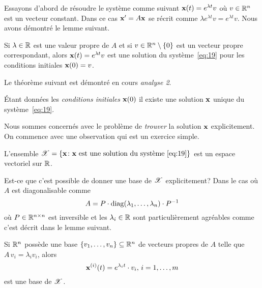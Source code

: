 Essayons d'abord de résoudre le système comme suivant $\mathbf{x}(t) = e^{\lambda t} v$ où $v \in \mathbb{R}^n$ est un vecteur constant. Dans ce cas $\mathbf{x}' = A\mathbf{x}$ se récrit comme   $\lambda e^{\lambda t}  v = e^{\lambda t} v$. Nous avons démontré le lemme suivant. 

\begin{lemma}
  \label{thr:29}
  Si $\lambda \in \mathbb{R}$ est une valeur propre de $A$ et si $v \in \mathbb{R}^n \setminus \{0\}$ est un vecteur propre correspondant, alors $\mathbf{x}(t) = e^{\lambda t} v$ est  une solution du système~\eqref{eq:19} pour les conditions initiales $\mathbf{x}(0) = v$. 
\end{lemma}


Le théorème suivant est démontré en cours \emph{analyse 2}. 
\begin{theorem} 
  \label{thr:28}
  Étant données les \emph{conditions initiales} $\mathbf{x}(0)$
  il existe une solution $\mathbf{x}$ unique du système~\eqref{eq:19}. 
\end{theorem}
Nous sommes concernés avec le problème de \emph{trouver} la solution $\mathbf{x}$ explicitement. On commence avec une observation qui est un exercice simple. 

\begin{lemma}
  \label{lem:13}
  L'ensemble $\mathscr{X} = \{ \mathbf{x} \colon \mathbf{x} \text{ est une solution du système \eqref{eq:19}}\}$ est un espace vectoriel sur $\mathbb{R}$.  
\end{lemma}

Est-ce que c'est possible de donner  une base de $\mathscr{X}$ explicitement? Dans le cas où $A$ est diagonalisable comme 
\begin{displaymath}
  A = P \cdot \operatorname{diag}(\lambda_1,\dots,\lambda_n) \cdot P^{-1} 
\end{displaymath}
où $P \in \mathbb{R}^{n \times n}$ est inversible et les  $\lambda_i \in \mathbb{R}$ sont particulièrement agréables comme c'est décrit dans le lemme suivant. 

\begin{theorem}
  \label{thr:30}
  Si $\mathbb{R}^n$ possède une base $\{v_1,\dots,v_n\} \subseteq \mathbb{R}^n$ de vecteurs propres de $A$ telle que $A \, v_i = \lambda_i v_i$, alors  
  \begin{displaymath}
    \mathbf{x}^{(i)}(t) = e^{\lambda_i t} \cdot v_i, \, i=1,\dots,m
  \end{displaymath}
est une base de $\mathscr{X}$. 
\end{theorem}

